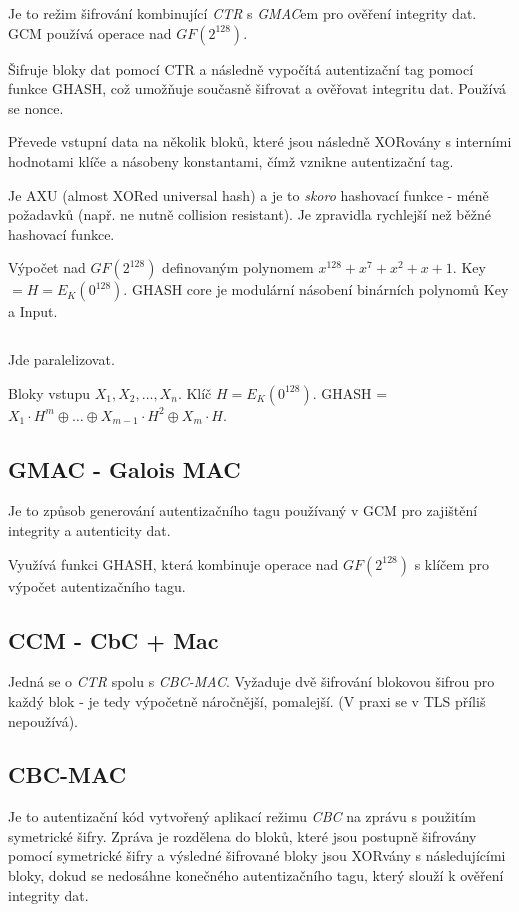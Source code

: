 \documentclass[10pt,a4paper]{article}
\begin{document}
Je to režim šifrování kombinující \textit{CTR} s \textit{GMAC}em pro ověření integrity dat. 
GCM používá operace nad $ GF(2^128) $.

Šifruje bloky dat pomocí CTR a následně vypočítá autentizační tag pomocí funkce GHASH, což umožňuje současně šifrovat a ověřovat integritu dat.
Používá se nonce.


Převede vstupní data na několik bloků, které jsou následně XORovány s interními hodnotami klíče a násobeny konstantami, čímž vznikne autentizační tag.
 
Je AXU (almost XORed universal hash) a je to \textit{skoro} hashovací funkce - méně požadavků (např. ne nutně collision resistant). 
Je zpravidla rychlejší než běžné hashovací funkce.


Výpočet nad $GF(2^{128})$ definovaným polynomem $x^{128} + x^7 + x^2 + x +1$.
Key $=H = E_K(0^{128})$.
GHASH core je modulární násobení binárních polynomů Key a Input.

$ $

Jde paralelizovat.

Bloky vstupu $X_1, X_2, \ldots, X_n$. Klíč $H = E_K(0^{128})$. 
GHASH = $X_1 \cdot H^m \oplus \ldots \oplus X_{m-1} \cdot H^2 \oplus X_m \cdot H$.

\subsection{GMAC - Galois MAC}

Je to způsob generování autentizačního tagu používaný v GCM pro zajištění integrity a autenticity dat.

Využívá funkci GHASH, která kombinuje operace nad $GF(2^128)$ s klíčem pro výpočet autentizačního tagu.



\subsection{CCM - CbC + Mac}
Jedná se o \textit{CTR} spolu s \textit{CBC-MAC}.
Vyžaduje dvě šifrování blokovou šifrou pro každý blok - je tedy výpočetně náročnější, pomalejší.
(V praxi se v TLS příliš nepoužívá).

\subsection{CBC-MAC}
Je to autentizační kód vytvořený aplikací režimu \textit{CBC} na zprávu s použitím symetrické šifry. 
Zpráva je rozdělena do bloků, které jsou postupně šifrovány pomocí symetrické šifry a výsledné šifrované bloky jsou XORvány s následujícími bloky, dokud se nedosáhne konečného autentizačního tagu, který slouží k ověření integrity dat.
\end{document}
